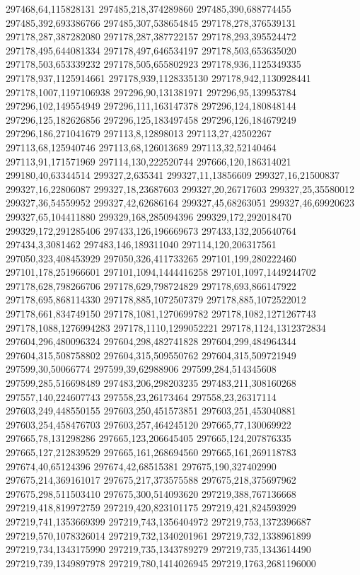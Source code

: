 297468,64,115828131
297485,218,374289860
297485,390,688774455
297485,392,693386766
297485,307,538654845
297178,278,376539131
297178,287,387282080
297178,287,387722157
297178,293,395524472
297178,495,644081334
297178,497,646534197
297178,503,653635020
297178,503,653339232
297178,505,655802923
297178,936,1125349335
297178,937,1125914661
297178,939,1128335130
297178,942,1130928441
297178,1007,1197106938
297296,90,131381971
297296,95,139953784
297296,102,149554949
297296,111,163147378
297296,124,180848144
297296,125,182626856
297296,125,183497458
297296,126,184679249
297296,186,271041679
297113,8,12898013
297113,27,42502267
297113,68,125940746
297113,68,126013689
297113,32,52140464
297113,91,171571969
297114,130,222520744
297666,120,186314021
299180,40,63344514
299327,2,635341
299327,11,13856609
299327,16,21500837
299327,16,22806087
299327,18,23687603
299327,20,26717603
299327,25,35580012
299327,36,54559952
299327,42,62686164
299327,45,68263051
299327,46,69920623
299327,65,104411880
299329,168,285094396
299329,172,292018470
299329,172,291285406
297433,126,196669673
297433,132,205640764
297434,3,3081462
297483,146,189311040
297114,120,206317561
297050,323,408453929
297050,326,411733265
297101,199,280222460
297101,178,251966601
297101,1094,1444416258
297101,1097,1449244702
297178,628,798266706
297178,629,798724829
297178,693,866147922
297178,695,868114330
297178,885,1072507379
297178,885,1072522012
297178,661,834749150
297178,1081,1270699782
297178,1082,1271267743
297178,1088,1276994283
297178,1110,1299052221
297178,1124,1312372834
297604,296,480096324
297604,298,482741828
297604,299,484964344
297604,315,508758802
297604,315,509550762
297604,315,509721949
297599,30,50066774
297599,39,62988906
297599,284,514345608
297599,285,516698489
297483,206,298203235
297483,211,308160268
297557,140,224607743
297558,23,26173464
297558,23,26317114
297603,249,448550155
297603,250,451573851
297603,251,453040881
297603,254,458476703
297603,257,464245120
297665,77,130069922
297665,78,131298286
297665,123,206645405
297665,124,207876335
297665,127,212839529
297665,161,268694560
297665,161,269118783
297674,40,65124396
297674,42,68515381
297675,190,327402990
297675,214,369161017
297675,217,373575588
297675,218,375697962
297675,298,511503410
297675,300,514093620
297219,388,767136668
297219,418,819972759
297219,420,823101175
297219,421,824593929
297219,741,1353669399
297219,743,1356404972
297219,753,1372396687
297219,570,1078326014
297219,732,1340201961
297219,732,1338961899
297219,734,1343175990
297219,735,1343789279
297219,735,1343614490
297219,739,1349897978
297219,780,1414026945
297219,1763,2681196000
